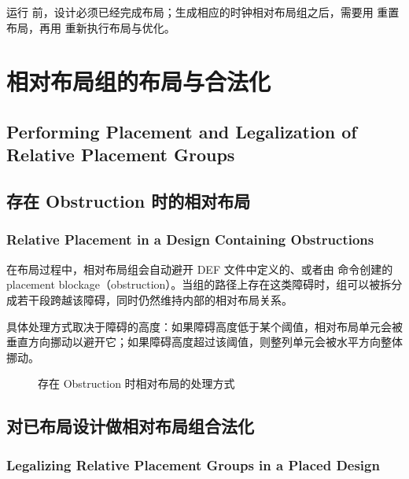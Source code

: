 运行  前，设计必须已经完成布局；生成相应的时钟相对布局组之后，需要用  重置布局，再用  重新执行布局与优化。

\section{相对布局组的布局与合法化}
\subsection*{Performing Placement and Legalization of Relative Placement Groups}

\subsection{存在 Obstruction 时的相对布局}
\subsubsection*{Relative Placement in a Design Containing Obstructions}

在布局过程中，相对布局组会自动避开 DEF 文件中定义的、或者由  命令创建的 placement blockage（obstruction）。当组的路径上存在这类障碍时，组可以被拆分成若干段跨越该障碍，同时仍然维持内部的相对布局关系。

具体处理方式取决于障碍的高度：如果障碍高度低于某个阈值，相对布局单元会被垂直方向挪动以避开它；如果障碍高度超过该阈值，则整列单元会被水平方向整体挪动。

\begin{figure}[htbp]
\centering
{}
\caption{存在 Obstruction 时相对布局的处理方式}
\label{fig:rp-obstruction}
\end{figure}

\subsection{对已布局设计做相对布局组合法化}
\subsubsection*{Legalizing Relative Placement Groups in a Placed Design}


